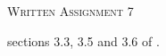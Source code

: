 \documentclass{article}
\title{}
\date{}
\begin{document}
\begin{center}
\textsc{\LARGE Written Assignment 7}\\[0.5cm]
\end{center}
\From sections 3.3, 3.5 and 3.6 of \VCT.
\end{document}
